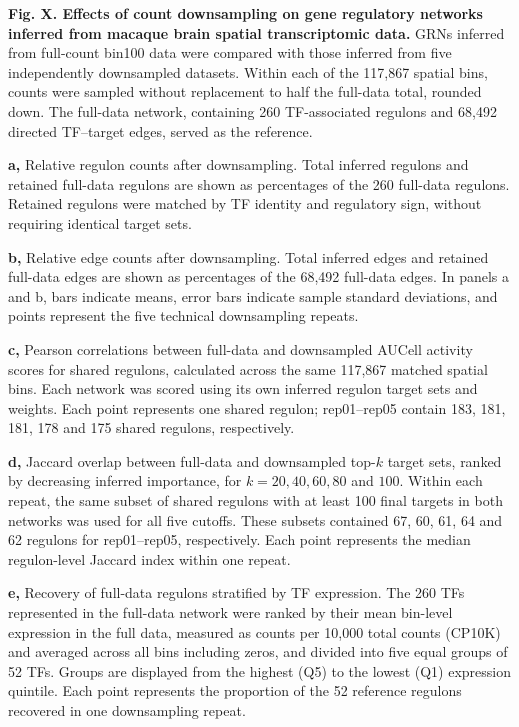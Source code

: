 \textbf{Fig. X. Effects of count downsampling on gene regulatory networks inferred from macaque brain spatial transcriptomic data.}
GRNs inferred from full-count bin100 data were compared with those inferred from five independently downsampled datasets. Within each of the 117,867 spatial bins, counts were sampled without replacement to half the full-data total, rounded down. The full-data network, containing 260 TF-associated regulons and 68,492 directed TF--target edges, served as the reference.

\textbf{a,} Relative regulon counts after downsampling. Total inferred regulons and retained full-data regulons are shown as percentages of the 260 full-data regulons. Retained regulons were matched by TF identity and regulatory sign, without requiring identical target sets.

\textbf{b,} Relative edge counts after downsampling. Total inferred edges and retained full-data edges are shown as percentages of the 68,492 full-data edges. In panels a and b, bars indicate means, error bars indicate sample standard deviations, and points represent the five technical downsampling repeats.

\textbf{c,} Pearson correlations between full-data and downsampled AUCell activity scores for shared regulons, calculated across the same 117,867 matched spatial bins. Each network was scored using its own inferred regulon target sets and weights. Each point represents one shared regulon; rep01--rep05 contain 183, 181, 181, 178 and 175 shared regulons, respectively.

\textbf{d,} Jaccard overlap between full-data and downsampled top-\(k\) target sets, ranked by decreasing inferred importance, for \(k=20,40,60,80\) and \(100\). Within each repeat, the same subset of shared regulons with at least 100 final targets in both networks was used for all five cutoffs. These subsets contained 67, 60, 61, 64 and 62 regulons for rep01--rep05, respectively. Each point represents the median regulon-level Jaccard index within one repeat.

\textbf{e,} Recovery of full-data regulons stratified by TF expression. The 260 TFs represented in the full-data network were ranked by their mean bin-level expression in the full data, measured as counts per 10,000 total counts (CP10K) and averaged across all bins including zeros, and divided into five equal groups of 52 TFs. Groups are displayed from the highest (Q5) to the lowest (Q1) expression quintile. Each point represents the proportion of the 52 reference regulons recovered in one downsampling repeat.


